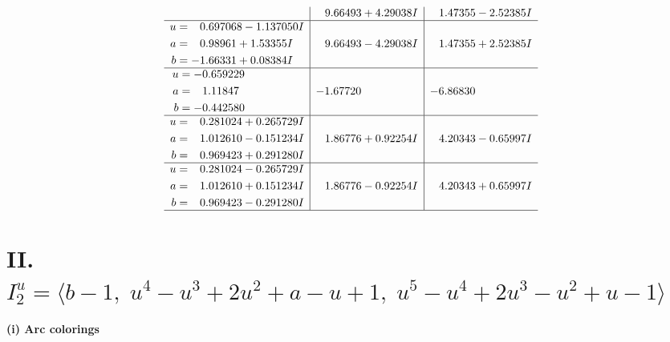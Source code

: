 \documentclass[1p]{elsarticle_modified}
\theoremstyle{definition}
\begin{document}
$$\begin{array}{c|c|c}
 & \phantom{-}9.66493 + 4.29038 I & \phantom{-}1.47355 - 2.52385 I \\ \hline\begin{aligned}
u &= \phantom{-}0.697068 - 1.137050 I \\
a &= \phantom{-}0.98961 + 1.53355 I \\
b &= -1.66331 + 0.08384 I\end{aligned}
 & \phantom{-}9.66493 - 4.29038 I & \phantom{-}1.47355 + 2.52385 I \\ \hline\begin{aligned}
u &= -0.659229\phantom{ +0.000000I} \\
a &= \phantom{-}1.11847\phantom{ +0.000000I} \\
b &= -0.442580\phantom{ +0.000000I}\end{aligned}
 & -1.67720\phantom{ +0.000000I} & -6.86830\phantom{ +0.000000I} \\ \hline\begin{aligned}
u &= \phantom{-}0.281024 + 0.265729 I \\
a &= \phantom{-}1.012610 - 0.151234 I \\
b &= \phantom{-}0.969423 + 0.291280 I\end{aligned}
 & \phantom{-}1.86776 + 0.92254 I & \phantom{-}4.20343 - 0.65997 I \\ \hline\begin{aligned}
u &= \phantom{-}0.281024 - 0.265729 I \\
a &= \phantom{-}1.012610 + 0.151234 I \\
b &= \phantom{-}0.969423 - 0.291280 I\end{aligned}
 & \phantom{-}1.86776 - 0.92254 I & \phantom{-}4.20343 + 0.65997 I\\
 \hline 
 \end{array}$$\newpage\newpage\renewcommand{\arraystretch}{1}
\centering \section*{II. $I^u_{2}= \langle b-1,\;u^4- u^3+2 u^2+a- u+1,\;u^5- u^4+2 u^3- u^2+u-1 \rangle$}
\flushleft \textbf{(i) Arc colorings}\\
\end{document}
